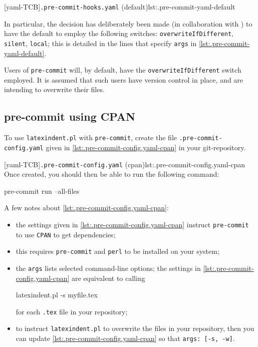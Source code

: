   [yaml-TCB]{\texttt{.pre-commit-hooks.yaml} (default)}{lst:.pre-commit-yaml-default}

  In particular, the decision has deliberately been made (in collaboration with
  \cite{holzhausprecommit}) to have the default to employ the following switches:
  \texttt{overwriteIfDifferent}, \texttt{silent}, \texttt{local}; this is detailed in the
  lines that specify \texttt{args} in \cref{lst:.pre-commit-yaml-default}.

  \begin{warning}
   Users of \texttt{pre-commit} will, by default, have the \texttt{overwriteIfDifferent}
   switch employed. It is assumed that such users have version control in place, and are
   intending to overwrite their files.
  \end{warning}

 \subsection{pre-commit using CPAN}\label{sec:pre-commit-cpan}

  To use \texttt{latexindent.pl} with \texttt{pre-commit}, create the file
  \texttt{.pre-commit-config.yaml} given in \cref{lst:.pre-commit-config.yaml-cpan} in your
  git-repository.   

  [yaml-TCB]{\texttt{.pre-commit-config.yaml} (cpan)}{lst:.pre-commit-config.yaml-cpan}
  Once created, you should then be able to run the following command:
  \begin{commandshell}
pre-commit run --all-files  
\end{commandshell}
  A few notes about \cref{lst:.pre-commit-config.yaml-cpan}:
  \begin{itemize}
   \item the settings given in \cref{lst:.pre-commit-config.yaml-cpan} instruct
         \texttt{pre-commit} to use \texttt{CPAN} to get dependencies;
   \item this requires \texttt{pre-commit} and \texttt{perl} to be installed on your system;
   \item the \texttt{args} lists selected command-line options; the settings in
         \cref{lst:.pre-commit-config.yaml-cpan} are equivalent to calling
         \begin{commandshell}
latexindent.pl -s myfile.tex       
\end{commandshell}
         for each \texttt{.tex} file in your repository;
   \item to instruct \texttt{latexindent.pl} to overwrite the files in your repository, then you
         can update \cref{lst:.pre-commit-config.yaml-cpan} so that \texttt{args: [-s, -w]}.
  \end{itemize}

